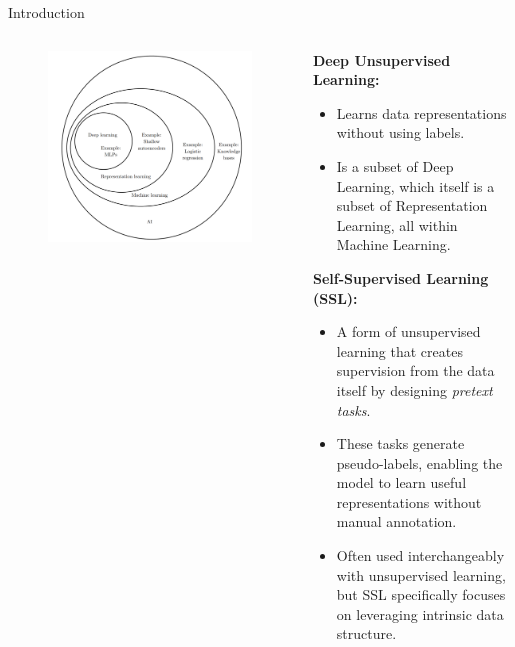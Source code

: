 \begin{frame}[allowframebreaks]{Introduction}
    \begin{columns}
    \begin{column}{0.55\textwidth}
        \begin{figure}
            \flushleft
            \includegraphics[width=\linewidth,height=0.8\textheight,keepaspectratio]{images/ssl/slide_3_1_img.png}
        \end{figure}
    \end{column}
    \begin{column}{0.62\textwidth}
        \textbf{Deep Unsupervised Learning:}
        \begin{itemize}
            \item Learns data representations without using labels.
            \item Is a subset of Deep Learning, which itself is a subset of Representation Learning, all within Machine Learning.
        \end{itemize}
        \vspace{0.5em}
        \textbf{Self-Supervised Learning (SSL):}
        \begin{itemize}
            \item A form of unsupervised learning that creates supervision from the data itself by designing \textit{pretext tasks}.
            \item These tasks generate pseudo-labels, enabling the model to learn useful representations without manual annotation.
            \item Often used interchangeably with unsupervised learning, but SSL specifically focuses on leveraging intrinsic data structure.
        \end{itemize}
    \end{column}
    \end{columns} 
\end{frame}


